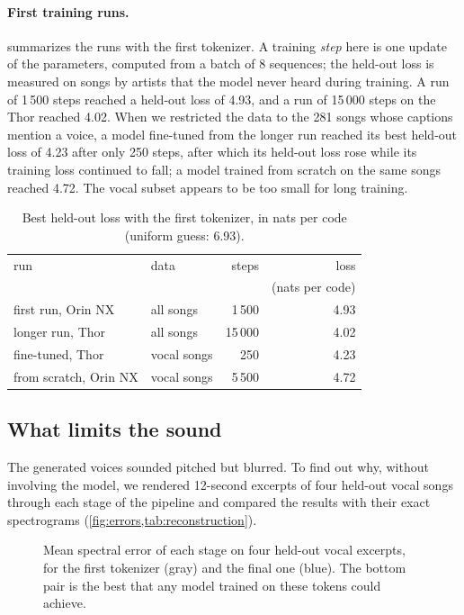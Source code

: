 \paragraph{First training runs.}  summarizes the runs with
the first tokenizer. A training \emph{step} here is one update of the
parameters, computed from a batch of 8 sequences; the held-out loss is measured
on songs by artists that the model never heard during training. A run of 1\,500 steps reached a held-out loss of 4.93, and
a run of 15\,000 steps on the Thor reached 4.02. When we restricted the data to
the 281 songs whose captions mention a voice, a model fine-tuned from the
longer run reached its best held-out loss of 4.23 after only 250 steps, after
which its held-out loss rose while its training loss continued to fall; a
model trained from scratch on the same songs reached 4.72. The vocal subset
appears to be too small for long training.

\begin{table}[htbp]
\centering
\caption{Best held-out loss with the first tokenizer, in nats per code
(uniform guess: 6.93).}
\label{tab:training}
\small
\setlength{\tabcolsep}{4pt}
\begin{tabular}{llrr}
\toprule
run & data & steps & loss \\
 & & & (nats per code) \\
\midrule
first run, Orin NX & all songs & 1\,500 & 4.93 \\
longer run, Thor & all songs & 15\,000 & 4.02 \\
fine-tuned, Thor & vocal songs & 250 & 4.23 \\
from scratch, Orin NX & vocal songs & 5\,500 & 4.72 \\
\bottomrule
\end{tabular}
\end{table}

\subsection{What limits the sound}
\label{sec:pipeline}

The generated voices sounded pitched but blurred. To find out why, without
involving the model, we rendered 12-second excerpts of four held-out vocal
songs through each stage of the pipeline and compared the results with their
exact spectrograms (\cref{fig:errors,tab:reconstruction}).

\begin{figure}[htbp]
\centering
\resizebox{\linewidth}{!}{}
\caption{Mean spectral error of each stage on four held-out vocal excerpts,
for the first tokenizer (gray) and the final one (blue). The bottom pair is
the best that any model trained on these tokens could achieve.}
\label{fig:errors}
\end{figure}

